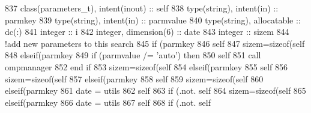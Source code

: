 \begin{DoxyCode}
837     \textcolor{keywordtype}{class}(parameters\_t), \textcolor{keywordtype}{intent(inout)} :: self
838     \textcolor{keywordtype}{type}(string), \textcolor{keywordtype}{intent(in)} :: parmkey
839     \textcolor{keywordtype}{type}(string), \textcolor{keywordtype}{intent(in)} :: parmvalue
840     \textcolor{keywordtype}{type}(string), \textcolor{keywordtype}{allocatable} :: dc(:)
841     \textcolor{keywordtype}{integer} :: i
842     \textcolor{keywordtype}{integer}, \textcolor{keywordtype}{dimension(6)} :: date
843     \textcolor{keywordtype}{integer} :: sizem
844     \textcolor{comment}{!add new parameters to this search}
845     \textcolor{keywordflow}{if} (parmkey%
846         self%
847         sizem=sizeof(self%
848     \textcolor{keywordflow}{elseif}(parmkey%
849         \textcolor{keywordflow}{if} (parmvalue /= \textcolor{stringliteral}{'auto'}) \textcolor{keywordflow}{then}
850             self%
851             \textcolor{keyword}{call }ompmanager%
852 \textcolor{keywordflow}{        end if}
853         sizem=sizeof(self%
854     \textcolor{keywordflow}{elseif}(parmkey%
855         self%
856         sizem=sizeof(self%
857     \textcolor{keywordflow}{elseif}(parmkey%
858         self%
859         sizem=sizeof(self%
860     \textcolor{keywordflow}{elseif}(parmkey%
861         date = utils%
862         self%
863         \textcolor{keywordflow}{if} (.not. self%
864         sizem=sizeof(self%
865     \textcolor{keywordflow}{elseif}(parmkey%
866         date = utils%
867         self%
868         \textcolor{keywordflow}{if} (.not. self%

\end{DoxyCode}
